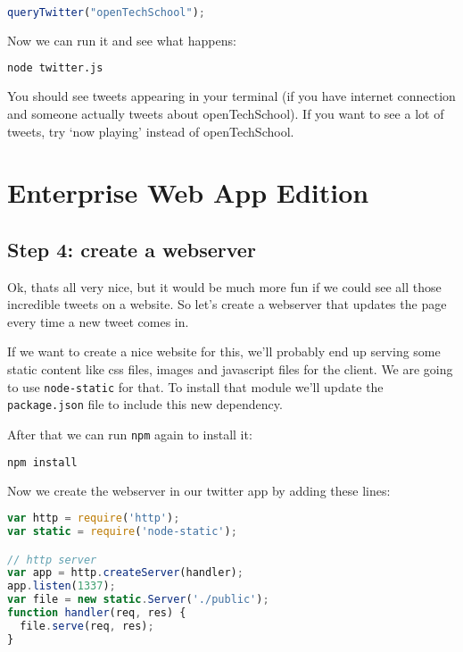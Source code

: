 \documentclass[a4paper]{report}
\begin{document}
\begin{lstlisting}[language=JavaScript]
queryTwitter("openTechSchool");
\end{lstlisting}

\noindent Now we can run it and see what happens:
\begin{lstlisting}[language=bash]
node twitter.js
\end{lstlisting}

\noindent You should see tweets appearing in your terminal (if you have internet connection and someone actually tweets about openTechSchool). If you want to see a lot of tweets, try `now playing' instead of openTechSchool.

\section*{Enterprise Web App Edition}

\subsection*{Step 4: create a webserver}
Ok, thats all very nice, but it would be much more fun if we could see all those incredible tweets on a website. So let's create a webserver that updates the page every time a new tweet comes in.

If we want to create a nice website for this, we'll probably end up serving some static content like css files, images and javascript files for the client. We are going to use \texttt{node-static} for that. To install that module we'll update the \texttt{package.json} file to include this new dependency.



After that we can run \texttt{npm} again to install it:
\begin{lstlisting}[language=bash]
npm install
\end{lstlisting}

\noindent Now we create the webserver in our twitter app by adding these lines:

\begin{lstlisting}[language=JavaScript]
var http = require('http');
var static = require('node-static');

// http server
var app = http.createServer(handler);
app.listen(1337);
var file = new static.Server('./public');
function handler(req, res) {
  file.serve(req, res);
}
\end{lstlisting}
\end{document}
